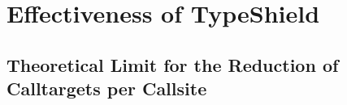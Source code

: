 \section{Effectiveness of TypeShield}
\label{section:typeshieldeffectiveness}

\subsection{Theoretical Limit for the Reduction of Calltargets per Callsite}
\label{subsection:theoreticallimit}

%
%
%	
%
%
%
%	
%	
